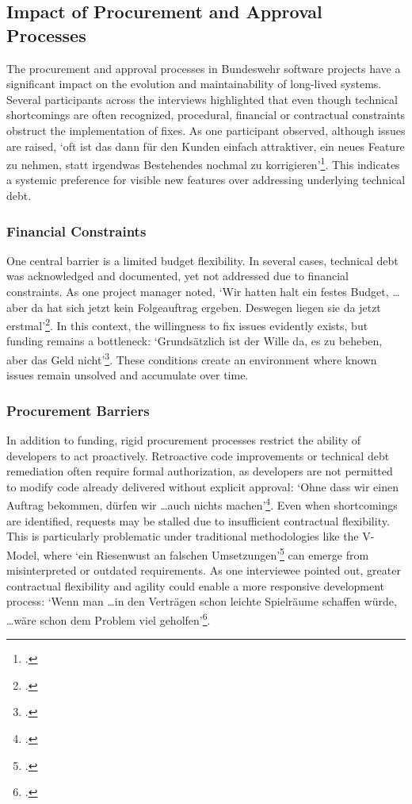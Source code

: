 \subsection{Impact of Procurement and Approval Processes}
The procurement and approval processes in Bundeswehr software projects have a significant impact on the evolution and maintainability of long-lived systems. Several participants across the interviews highlighted that even though technical shortcomings are often recognized, 
procedural, financial or contractual constraints obstruct the implementation of fixes. As one participant observed, although issues are raised, `oft ist das dann für den Kunden einfach attraktiver, ein neues Feature zu nehmen, statt irgendwas Bestehendes nochmal zu korrigieren'\footcite{Interview32025}.
This indicates a systemic preference for visible new features over addressing underlying technical debt.

\subsubsection{Financial Constraints}
One central barrier is a limited budget flexibility. In several cases, technical debt was acknowledged and documented, yet not addressed due to financial constraints. As one project manager noted, `Wir hatten halt ein festes Budget, \ldots aber da hat sich jetzt kein Folgeauftrag ergeben. Deswegen liegen sie da jetzt erstmal'\footcite{Interview12025}.
In this context, the willingness to fix issues evidently exists, but funding remains a bottleneck: `Grundsätzlich ist der Wille da, es zu beheben, aber das Geld nicht'\footcite{Interview32025}. These conditions create an environment where known issues remain unsolved and accumulate over time.

\subsubsection{Procurement Barriers}
In addition to funding, rigid procurement processes restrict the ability of developers to act proactively. Retroactive code improvements or technical debt remediation often require formal authorization, as developers are not permitted to modify code already delivered without explicit approval:
`Ohne dass wir einen Auftrag bekommen, dürfen wir \ldots auch nichts machen'\footcite{Interview32025}. Even when shortcomings are identified, requests may be stalled due to insufficient contractual flexibility. This is particularly problematic under traditional methodologies like the V-Model, where
`ein Riesenwust an falschen Umsetzungen'\footcite{Interview32025} can emerge from misinterpreted or outdated requirements. As one interviewee pointed out, greater contractual flexibility and agility could enable a more responsive development process:
`Wenn man \ldots in den Verträgen schon leichte Spielräume schaffen würde, \ldots wäre schon dem Problem viel geholfen'\footcite{Interview32025}.

